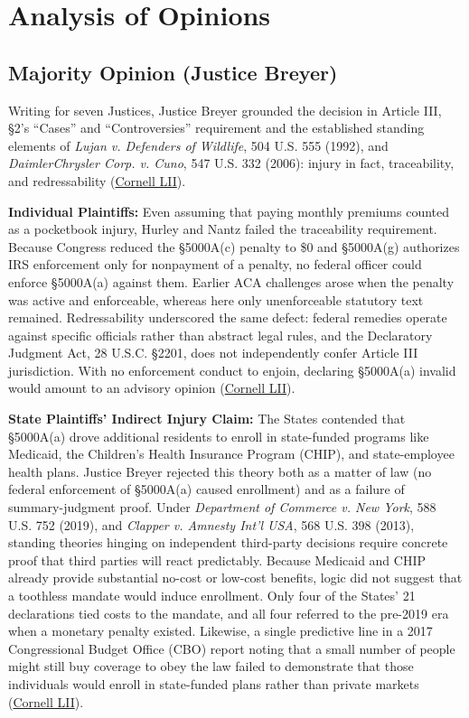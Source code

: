 \documentclass[12pt]{article}
\begin{document}
\section{Analysis of Opinions}

\subsection{Majority Opinion (Justice Breyer)}

Writing for seven Justices, Justice Breyer grounded the decision in Article III, \S 2's ``Cases'' and ``Controversies'' requirement and the established standing elements of \textit{Lujan v. Defenders of Wildlife}, 504 U.S. 555 (1992), and \textit{DaimlerChrysler Corp. v. Cuno}, 547 U.S. 332 (2006): injury in fact, traceability, and redressability (\href{https://www.law.cornell.edu/supremecourt/text/19-840}{Cornell LII}).

\textbf{Individual Plaintiffs:} Even assuming that paying monthly premiums counted as a pocketbook injury, Hurley and Nantz failed the traceability requirement. Because Congress reduced the \S 5000A(c) penalty to \$0 and \S 5000A(g) authorizes IRS enforcement only for nonpayment of a penalty, no federal officer could enforce \S 5000A(a) against them. Earlier ACA challenges arose when the penalty was active and enforceable, whereas here only unenforceable statutory text remained. Redressability underscored the same defect: federal remedies operate against specific officials rather than abstract legal rules, and the Declaratory Judgment Act, 28 U.S.C. \S 2201, does not independently confer Article III jurisdiction. With no enforcement conduct to enjoin, declaring \S 5000A(a) invalid would amount to an advisory opinion (\href{https://www.law.cornell.edu/supremecourt/text/19-840}{Cornell LII}).

\textbf{State Plaintiffs' Indirect Injury Claim:} The States contended that \S 5000A(a) drove additional residents to enroll in state-funded programs like Medicaid, the Children's Health Insurance Program (CHIP), and state-employee health plans. Justice Breyer rejected this theory both as a matter of law (no federal enforcement of \S 5000A(a) caused enrollment) and as a failure of summary-judgment proof. Under \textit{Department of Commerce v. New York}, 588 U.S. 752 (2019), and \textit{Clapper v. Amnesty Int'l USA}, 568 U.S. 398 (2013), standing theories hinging on independent third-party decisions require concrete proof that third parties will react predictably. Because Medicaid and CHIP already provide substantial no-cost or low-cost benefits, logic did not suggest that a toothless mandate would induce enrollment. Only four of the States' 21 declarations tied costs to the mandate, and all four referred to the pre-2019 era when a monetary penalty existed. Likewise, a single predictive line in a 2017 Congressional Budget Office (CBO) report noting that a small number of people might still buy coverage to obey the law failed to demonstrate that those individuals would enroll in state-funded plans rather than private markets (\href{https://www.law.cornell.edu/supremecourt/text/19-840}{Cornell LII}).
\end{document}
